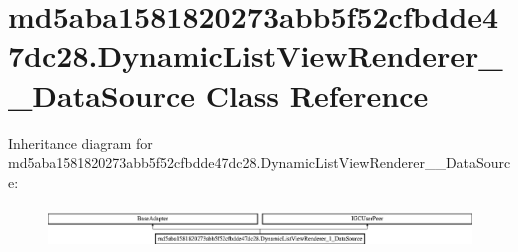 \hypertarget{classmd5aba1581820273abb5f52cfbdde47dc28_1_1DynamicListViewRenderer__1__DataSource}{}\section{md5aba1581820273abb5f52cfbdde47dc28.\+Dynamic\+List\+View\+Renderer\+\_\+\_\+\+Data\+Source Class Reference}
\label{classmd5aba1581820273abb5f52cfbdde47dc28_1_1DynamicListViewRenderer__1__DataSource}
Inheritance diagram for md5aba1581820273abb5f52cfbdde47dc28.\+Dynamic\+List\+View\+Renderer\+\_\+\_\+\+Data\+Source\+:\begin{figure}[H]
\begin{center}
\leavevmode
\includegraphics[height=1.115538cm]{classmd5aba1581820273abb5f52cfbdde47dc28_1_1DynamicListViewRenderer__1__DataSource}
\end{center}
\end{figure}
